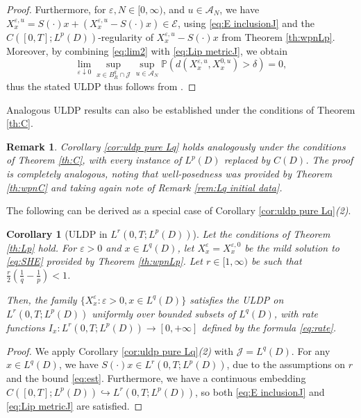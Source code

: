 \documentclass[10pt,a4paper]{amsart}
\newtheorem{remark}[theorem]{Remark}
\newtheorem{corollary}[theorem]{Corollary}
\numberwithin{equation}{section}
\newcommand{\col}{\colon}
\renewcommand{\P}{{\mathbb P}}
\newcommand{\eps}{\varepsilon}
\newcommand{\A}{{\mathcal A}}
\newcommand{\into}{\hookrightarrow}
\begin{document}
\begin{proof}
Furthermore, for $\eps,N\in[0,\infty)$, and $u\in \A_N$, we have  $X_x^{\eps,u}=S(\cdot)x+(X_x^{\eps,u}-S(\cdot)x)\in \mathcal{E}$, using \eqref{eq:E inclusionJ} and the $C([0,T];L^p(D))$-regularity of $X_x^{\eps,u}-S(\cdot)x$ from  Theorem \ref{th:wpnLp}. Moreover, by combining \eqref{eq:lim2} with \eqref{eq:Lip metricJ}, we obtain
\[
\lim_{\eps\downarrow 0}\sup_{x\in B_R^q\cap\mathcal{J}}\sup_{u\in\A_N}\P(d(X_x^{\eps,u},X_x^{0,u})>\delta)=0, \]
thus the stated ULDP thus follows from \cite[Th.\ 3.12]{Salins19equivalences}. 
\end{proof}

Analogous ULDP results can also be established under the conditions of Theorem \ref{th:C}.  

\begin{remark}\label{rem:more uldps}
Corollary \ref{cor:uldp pure Lq} holds analogously   under the conditions of Theorem \ref{th:C}, with every instance of $L^p(D)$ replaced by $C(D)$. The proof is completely analogous, noting that well-posedness was provided by Theorem \ref{th:wpnC} and  taking again note of Remark \ref{rem:Lq initial data}. 
\end{remark}

The following can be derived as a special case of Corollary \ref{cor:uldp pure Lq}\textit{(2)}.

\begin{corollary}[ULDP  in $L^r(0,T;L^p(D))$]\label{cor:uldp LrLp}  
Let the conditions of Theorem \ref{th:Lp} hold. For $\eps>0$ and $x\in L^q(D)$, let $X_x^{\eps}=X_x^{\eps,0}$ be the mild solution to \eqref{eq:SHE} provided by Theorem \ref{th:wpnLp}.  Let $r \in [1,\infty)$ be such that  $\frac{r}{2}(\frac1q-\frac{1}{p})<1$. 

Then, the family  $\{X_x^{\eps} :\eps>0,x\in L^q(D)\}$  satisfies the ULDP on $L^r(0,T;L^{p}(D))$  uniformly over bounded subsets of $L^q(D)$, with rate functions $I_x\col L^r(0,T;L^{p}(D))\to [0,+\infty]$ defined by the formula \eqref{eq:rate}. 
\end{corollary}
\begin{proof}
We apply Corollary \ref{cor:uldp pure Lq}\textit{(2)} with $\mathcal{J}=L^q(D)$. 
    For any $x\in L^q(D)$, we have  $S(\cdot)x\in L^r(0,T;L^{p}(D))$, due to the assumptions on $r$ and the bound \eqref{eq:est}. Furthermore, we have a continuous embedding $C([0,T];L^p(D))\into L^r(0,T;L^{p}(D))$, so both \eqref{eq:E inclusionJ} and \eqref{eq:Lip metricJ} are satisfied. 
\end{proof}
\end{document}
